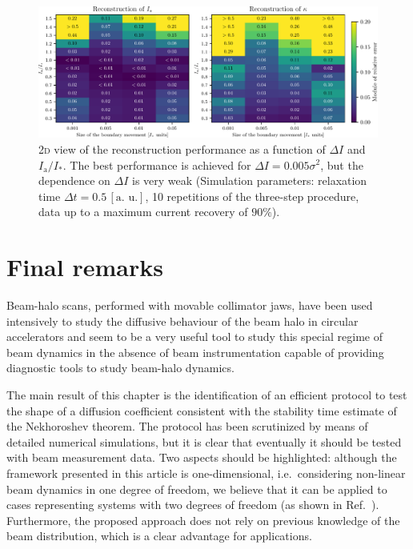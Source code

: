 \begin{figure}[t]
    \centering
    \includegraphics[width=\textwidth]{4_probing_the_diffusive_behavior/figs/final/MULTI_different_step_size.pdf}
    \caption{2\textsc{d} view of the reconstruction performance as a function of $\Delta I$ and $I_\mathrm{a}/I_\ast$. The  best performance is achieved for $\Delta I = 0.005 \sigma^2$, but the dependence on $\Delta I$ is very weak (Simulation parameters: relaxation time $\Delta t=0.5 \, [\text{a. u.}]$, 10 repetitions of the three-step procedure, data up to a maximum current recovery of $90\%$).}
    \label{fig:different_movement_module}
\end{figure}


\section{Final remarks}
\label{sec:conclusions}


Beam-halo scans, performed with movable collimator jaws, have been used intensively to study the diffusive behaviour of the beam halo in circular accelerators and seem to be a very useful tool to study this special regime of beam dynamics in the absence of beam instrumentation capable of providing diagnostic tools to study beam-halo dynamics.

{The main result of this chapter} is the identification of an efficient protocol to test the shape of {a diffusion coefficient consistent with the stability time estimate of the Nekhoroshev theorem}. The protocol has been scrutinized by means of detailed numerical simulations, but it is clear that eventually it should be tested with beam measurement data. Two aspects should be highlighted: although the framework presented in this article is one-dimensional, i.e.\ considering non-linear beam dynamics in one degree of freedom, we believe that it can be applied to cases representing systems with two degrees of freedom (as shown in Ref.~\cite{bazzani2020diffusion}). Furthermore, the proposed approach does not rely on previous knowledge of the beam distribution, which is a clear advantage for applications. 
 
